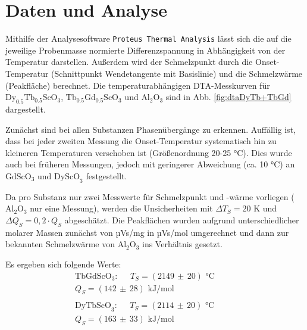\documentclass[aps,twocolumn,secnumarabic,nobalancelastpage,amsmath,amssymb,
nofootinbib,superscriptaddress]{revtex4-1}
\begin{document}

\section{Daten und Analyse}
\noindent Mithilfe der Analysesoftware \texttt{Proteus Thermal Analysis} lässt sich die auf die jeweilige Probenmasse normierte Differenzspannung in
Abhängigkeit von der Temperatur darstellen. Außerdem wird der Schmelzpunkt durch die Onset-Temperatur (Schnittpunkt Wendetangente mit Basislinie) \cite{versuchsbeschr} und die Schmelzwärme (Peakfläche)
berechnet. Die temperaturabhängigen DTA-Messkurven für $\text{Dy}_{0.5}\text{Tb}_{0.5}\text{ScO}_3$, $\text{Tb}_{0.5}\text{Gd}_{0.5}\text{ScO}_3$ und $\text{Al}_{2}\text{O}_3$ sind in Abb. \ref{fig:dtaDyTb+TbGd} dargestellt.

Zunächst sind bei allen Substanzen Phasenübergänge zu erkennen. Auffällig ist, dass bei jeder zweiten Messung die Onset-Temperatur systematisch hin zu kleineren Temperaturen verschoben ist (Größenordnung 20-25 °C).
Dies wurde auch bei früheren Messungen, jedoch mit geringerer Abweichung (ca. 10 °C) an $\text{GdScO}_3$ und $\text{DyScO}_3$ festgestellt.

Da pro Substanz nur zwei Messwerte für Schmelzpunkt und -wärme vorliegen ($\text{Al}_2\text{O}_3$ nur eine Messung), werden die Unsicherheiten mit $\Delta T_S=20\text{ K}$ und $\Delta Q_S=0,2\cdot Q_S$ abgeschätzt.
Die Peakflächen wurden aufgrund unterschiedlicher molarer Massen zunächst von µVs/mg in µVs/mol umgerechnet und dann zur bekannten Schmelzwärme von $\text{Al}_2\text{O}_3$ ins Verhältnis gesetzt.

Es ergeben sich folgende Werte:
\begin{eqnarray}
  \text{TbGdScO}_3:\;\;\;\;\; T_S = (2149\,\pm\, 20)\text{ °C}\;\:\,\;\;\;\;\;\:\: \nonumber \\
  Q_S = (142\,\pm\, 28)\text{ kJ/mol}            \;\;\;             \nonumber \\
                                                        \;\;\;               \nonumber \\
  \text{DyTbScO}_3:\;\;\;\;\; T_S = (2114\,\pm\, 20)\text{ °C}\;\:\,\;\;\;\;\;\:\: \nonumber \\
  Q_S = (163\,\pm\, 33)\text{ kJ/mol}                     \;\;\;             \nonumber
  \label{eq:XXX}
\end{eqnarray}
\end{document}
